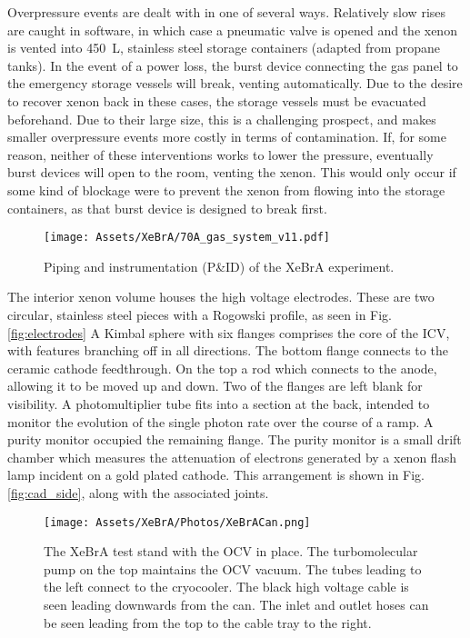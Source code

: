 Overpressure events are dealt with in one of several ways.
Relatively slow rises are caught in software, in which case a pneumatic valve is opened and the xenon is vented into 450~L, stainless steel storage containers (adapted from propane tanks).
In the event of a power loss, the burst device connecting the gas panel to the emergency storage vessels will break, venting automatically.
Due to the desire to recover xenon back in these cases, the storage vessels must be evacuated beforehand. 
Due to their large size, this is a challenging prospect, and makes smaller overpressure events more costly in terms of contamination.
If, for some reason, neither of these interventions works to lower the pressure, eventually burst devices will open to the room, venting the xenon.
This would only occur if some kind of blockage were to prevent the xenon from flowing into the storage containers, as that burst device is designed to break first.



\begin{sidewaysfigure} 
    \centering
    \texttt{[image: Assets/XeBrA/70A\_gas\_system\_v11.pdf]}
    \caption{Piping and instrumentation (P\&ID) of the XeBrA experiment.}
    \label{fig:xebra_pid}
\end{sidewaysfigure}


The interior xenon volume houses the high voltage electrodes.
These are two circular, stainless steel pieces with a Rogowski\cite{rogowski_elektrische_1923} profile, as seen in Fig.\ref{fig:electrodes}
A Kimbal sphere with six flanges comprises the core of the ICV, with features branching off in all directions.
The bottom flange connects to the  ceramic cathode feedthrough.
On the top a rod which connects to the anode, allowing it to be moved up and down.
Two of the flanges are left blank for visibility.
A photomultiplier tube fits into a section at the back, intended to monitor the evolution of the single photon rate over the course of a ramp.
A  purity monitor occupied the remaining flange.
The purity monitor is a small drift chamber which measures the attenuation of electrons generated by a xenon flash lamp incident on a gold plated cathode.
This arrangement is shown in Fig. \ref{fig:cad_side}, along with the associated joints.

\begin{figure} 
    \centering
    \texttt{[image: Assets/XeBrA/Photos/XeBrACan.png]}
    \caption[The XeBrA test stand with the OCV in place. ]%
    {The XeBrA test stand with the OCV in place. 
    The turbomolecular pump on the top maintains the OCV vacuum. The tubes leading to the left connect to the cryocooler. The black high voltage cable is seen leading downwards from the can. The inlet and outlet hoses can be seen leading from the top to the cable tray to the right.}
    \label{fig:xebra_test_stand}
\end{figure}

